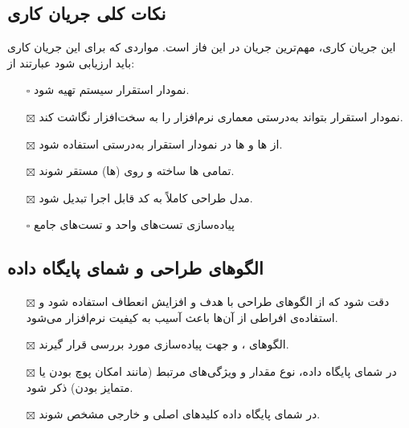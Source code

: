 \subsection{\hspace*{0.2cm}نکات کلی جریان کاری }
این جریان کاری، مهم‌ترین جریان در این فاز است. مواردی که برای این جریان کاری باید ارزیابی شود عبارتند از:
\begin{itemize} \setlength\itemsep{0cm}
	\item[$\square$]
	نمودار استقرار سیستم تهیه شود.
	\item[$\boxtimes$]
	نمودار استقرار بتواند به‌درستی معماری نرم‌افزار را به سخت‌افزار نگاشت کند.
	\item[$\boxtimes$]
	از  ها و  ها در نمودار استقرار به‌درستی استفاده شود.
	\item[$\boxtimes$]
	تمامی  ها ساخته و روی  (ها) مستقر شوند.
	\item[$\boxtimes$]
	مدل طراحی کاملاً به کد قابل اجرا تبدیل شود.
	\item[$\square$]
	پیاده‌سازی تست‌های واحد و تست‌های جامع

\end{itemize}

\subsection{\hspace*{0.2cm} الگوهای طراحی و شمای پایگاه داده}
\begin{itemize} \setlength\itemsep{0cm}
	\item[$\boxtimes$]
	دقت شود که از الگوهای طراحی با هدف  و افزایش انعطاف استفاده شود و استفاده‌ی افراطی از آن‌ها باعث آسیب به کیفیت نرم‌افزار می‌شود.
	\item[$\boxtimes$]
	الگوهای  ،  و  جهت پیاده‌سازی مورد بررسی قرار گیرند.
	\item[$\boxtimes$]
	در شمای پایگاه داده، نوع مقدار و ویژگی‌های مرتبط (مانند امکان پوچ بودن یا متمایز بودن) ذکر شود.
	\item[$\boxtimes$]
	در شمای پایگاه داده کلیدهای اصلی و خارجی مشخص شوند.
\end{itemize}

